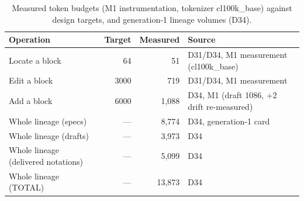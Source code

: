 \begin{table}[htbp]\centering\footnotesize
\caption{Measured token budgets (M1 instrumentation, tokenizer cl100k\_base) against design targets, and generation-1 lineage volumes (D34).}
\label{tab:budgets}
\begin{tabular}{@{}lrrl@{}}
\toprule
\textbf{Operation} & \textbf{Target} & \textbf{Measured} & \textbf{Source} \\
\midrule
Locate a block & 64 & 51 & D31/D34, M1 measurement (cl100k\_base) \\
Edit a block & 3000 & 719 & D31/D34, M1 measurement \\
Add a block & 6000 & 1,088 & D34, M1 (draft 1086, +2 drift re-measured) \\
Whole lineage (specs) & --- & 8,774 & D34, generation-1 card \\
Whole lineage (drafts) & --- & 3,973 & D34 \\
Whole lineage (delivered notations) & --- & 5,099 & D34 \\
Whole lineage (TOTAL) & --- & 13,873 & D34 \\
\bottomrule
\end{tabular}\end{table}

